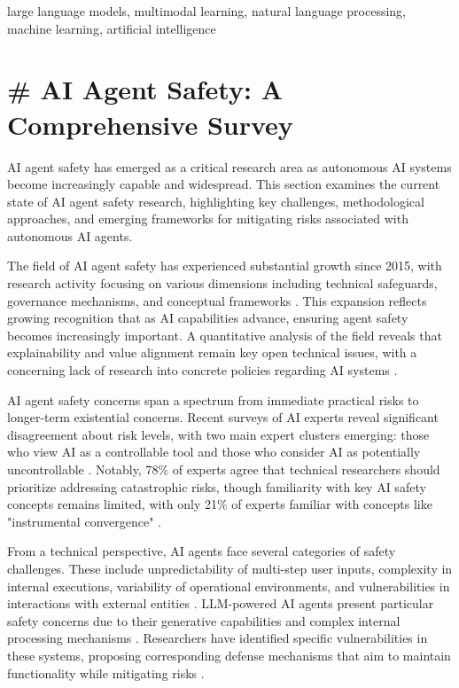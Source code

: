 \documentclass[conference]{IEEEtran}
\begin{document}
\begin{IEEEkeywords}
large language models, multimodal learning, natural language processing, machine learning, artificial intelligence
\end{IEEEkeywords}




\section{# AI Agent Safety: A Comprehensive Survey}

AI agent safety has emerged as a critical research area as autonomous AI systems become increasingly capable and widespread. This section examines the current state of AI agent safety research, highlighting key challenges, methodological approaches, and emerging frameworks for mitigating risks associated with autonomous AI agents.

The field of AI agent safety has experienced substantial growth since 2015, with research activity focusing on various dimensions including technical safeguards, governance mechanisms, and conceptual frameworks \cite{2002.05671}. This expansion reflects growing recognition that as AI capabilities advance, ensuring agent safety becomes increasingly important. A quantitative analysis of the field reveals that explainability and value alignment remain key open technical issues, with a concerning lack of research into concrete policies regarding AI systems \cite{2002.05671}.

AI agent safety concerns span a spectrum from immediate practical risks to longer-term existential concerns. Recent surveys of AI experts reveal significant disagreement about risk levels, with two main expert clusters emerging: those who view AI as a controllable tool and those who consider AI as potentially uncontrollable \cite{2502.14870}. Notably, 78\% of experts agree that technical researchers should prioritize addressing catastrophic risks, though familiarity with key AI safety concepts remains limited, with only 21\% of experts familiar with concepts like "instrumental convergence" \cite{2502.14870}.

From a technical perspective, AI agents face several categories of safety challenges. These include unpredictability of multi-step user inputs, complexity in internal executions, variability of operational environments, and vulnerabilities in interactions with external entities \cite{2406.02630}. LLM-powered AI agents present particular safety concerns due to their generative capabilities and complex internal processing mechanisms \cite{2406.08689}. Researchers have identified specific vulnerabilities in these systems, proposing corresponding defense mechanisms that aim to maintain functionality while mitigating risks \cite{2406.08689}.
\end{document}
